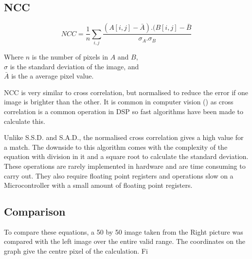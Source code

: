 \subsection{NCC}
\begin{equation}\label{eq:NCC}
NCC =  \frac{1}{n}\sum\limits_{i,j} \frac{(A[i,j] - \bar{A}).(B[i,j] - \bar{B}}{\sigma _A . \sigma _B}
\end{equation}
\begin{center}
Where $n$ is the number of pixels in $A$ and $B$, \\$\sigma$ is the standard deviation of the image, and \\$\bar{A}$ is the a average pixel value. 
\end{center}
NCC is very similar to cross correlation, but normalised to reduce the error if one image is brighter than the other. It is common in computer vision (\cite{Tsai:NCC}) as cross correlation is a common operation in DSP so fast algorithms have been made to calculate this. 

Unlike S.S.D. and S.A.D., the normalised cross correlation gives a high value for a match. The downside to this algorithm comes with the complexity of the equation with division in it and a square root to calculate the standard deviation. These operations are rarely implemented in hardware and are time consuming to carry out. They also require floating point registers and operations slow on a Microcontroller with a small amount of floating point registers. 



\subsection{Comparison}

To compare these equations, a 50 by 50 image taken from the Right picture was compared with the left image over the entire valid range. The coordinates on the graph give the centre pixel of the calculation. Fi

